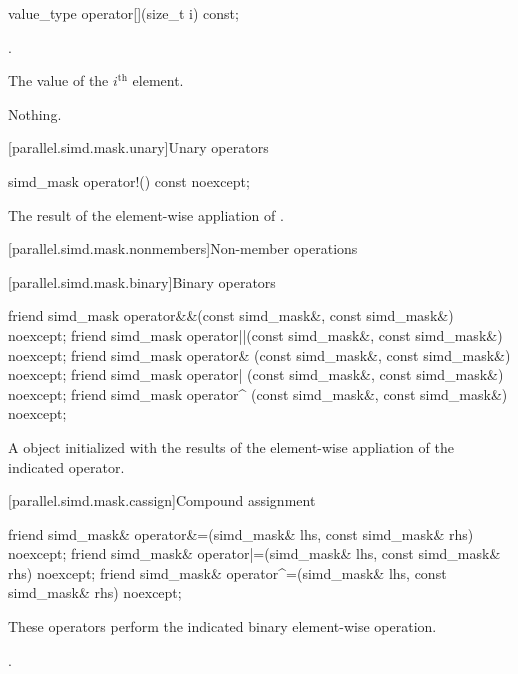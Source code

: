 \begin{itemdecl}
value_type operator[](size_t i) const;
\end{itemdecl}

\begin{itemdescr}
  \pnum\requires
  .

  \pnum\returns
  The value of the $i^\text{th}$ element.

  \pnum\throws Nothing.
\end{itemdescr}

[parallel.simd.mask.unary]{Unary operators}

\begin{itemdecl}
simd_mask operator!() const noexcept;
\end{itemdecl}

\begin{itemdescr}
  \pnum\returns
  The result of the element-wise appliation of .
\end{itemdescr}

[parallel.simd.mask.nonmembers]{Non-member operations}

[parallel.simd.mask.binary]{Binary operators}

\begin{itemdecl}
friend simd_mask operator&&(const simd_mask&, const simd_mask&) noexcept;
friend simd_mask operator||(const simd_mask&, const simd_mask&) noexcept;
friend simd_mask operator& (const simd_mask&, const simd_mask&) noexcept;
friend simd_mask operator| (const simd_mask&, const simd_mask&) noexcept;
friend simd_mask operator^ (const simd_mask&, const simd_mask&) noexcept;
\end{itemdecl}

\begin{itemdescr}
  \pnum\returns
  A  object initialized with the results of the element-wise appliation of the indicated operator.
\end{itemdescr}

[parallel.simd.mask.cassign]{Compound assignment}

\begin{itemdecl}
friend simd_mask& operator&=(simd_mask& lhs, const simd_mask& rhs) noexcept;
friend simd_mask& operator|=(simd_mask& lhs, const simd_mask& rhs) noexcept;
friend simd_mask& operator^=(simd_mask& lhs, const simd_mask& rhs) noexcept;
\end{itemdecl}

\begin{itemdescr}
  \pnum\effects
  These operators perform the indicated binary element-wise operation.

  \pnum\returns
  .
\end{itemdescr}

